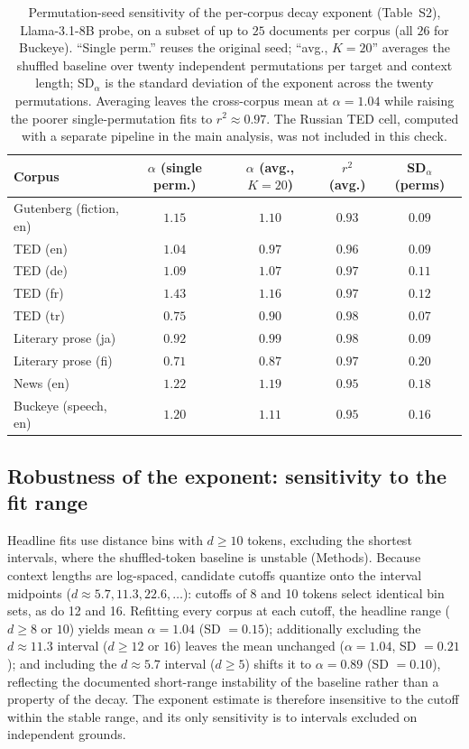 \documentclass[11pt]{article}
\begin{document}
\renewcommand{\thetable}{S2}
\begin{table}[h]
\centering
\small
\begin{tabular}{lcccc}
\toprule
Corpus & $\alpha$ (single perm.) & $\alpha$ (avg., $K=20$) & $r^2$ (avg.) & SD$_\alpha$ (perms) \\
\midrule
Gutenberg (fiction, en) & $1.15$ & $1.10$ & $0.93$ & $0.09$ \\
TED (en)                & $1.04$ & $0.97$ & $0.96$ & $0.09$ \\
TED (de)                & $1.09$ & $1.07$ & $0.97$ & $0.11$ \\
TED (fr)                & $1.43$ & $1.16$ & $0.97$ & $0.12$ \\
TED (tr)                & $0.75$ & $0.90$ & $0.98$ & $0.07$ \\
Literary prose (ja)     & $0.92$ & $0.99$ & $0.98$ & $0.09$ \\
Literary prose (fi)     & $0.71$ & $0.87$ & $0.97$ & $0.20$ \\
News (en)               & $1.22$ & $1.19$ & $0.95$ & $0.18$ \\
Buckeye (speech, en)    & $1.20$ & $1.11$ & $0.95$ & $0.16$ \\
\bottomrule
\end{tabular}
\caption{Permutation-seed sensitivity of the per-corpus decay exponent (Table~S2), Llama-3.1-8B
probe, on a subset of up to $25$ documents per corpus (all $26$ for Buckeye). ``Single perm.'' reuses
the original seed; ``avg., $K=20$'' averages the shuffled baseline over twenty independent
permutations per target and context length; SD$_\alpha$ is the standard deviation of the exponent
across the twenty permutations. Averaging leaves the cross-corpus mean at $\alpha=1.04$ while raising
the poorer single-permutation fits to $r^2\approx0.97$. The Russian TED cell, computed with a
separate pipeline in the main analysis, was not included in this check.}
\end{table}

\subsection*{Robustness of the exponent: sensitivity to the fit range}

Headline fits use distance bins with $d \geq 10$ tokens, excluding the shortest intervals, where
the shuffled-token baseline is unstable (Methods). Because context lengths are log-spaced,
candidate cutoffs quantize onto the interval midpoints ($d \approx 5.7, 11.3, 22.6, \ldots$):
cutoffs of 8 and 10 tokens select identical bin sets, as do 12 and 16. Refitting every corpus at
each cutoff, the headline range ($d \geq 8$ or $10$) yields mean $\alpha = 1.04$ (SD $= 0.15$);
additionally excluding the $d \approx 11.3$ interval ($d \geq 12$ or $16$) leaves the mean
unchanged ($\alpha = 1.04$, SD $= 0.21$); and including the $d \approx 5.7$ interval
($d \geq 5$) shifts it to $\alpha = 0.89$ (SD $= 0.10$), reflecting the documented short-range
instability of the baseline rather than a property of the decay. The exponent estimate is
therefore insensitive to the cutoff within the stable range, and its only sensitivity is to
intervals excluded on independent grounds.
\end{document}
